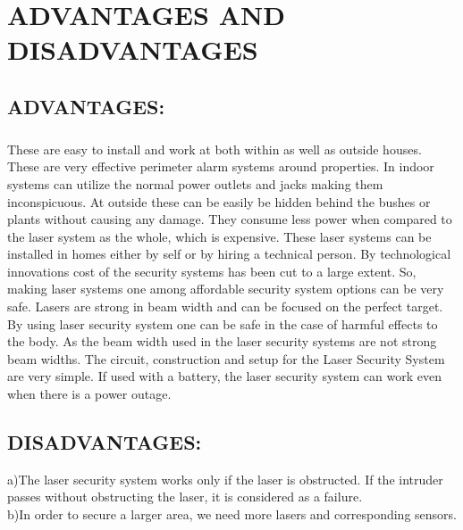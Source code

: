 
\chapter{ADVANTAGES AND DISADVANTAGES}
\section{ADVANTAGES:}
\paragraph{}
These are easy to install and work at both within as well as outside houses. These are very effective perimeter alarm systems around properties. In indoor systems can utilize the normal power outlets and jacks making them inconspicuous. At outside these can be easily be hidden behind the bushes or plants without causing any damage. They consume less power when compared to the laser system as the whole, which is expensive.
These laser systems can be installed in homes either by self or by hiring a technical person. By technological innovations cost of the security systems has been cut to a large extent. So, making laser systems one among affordable security system options can be very safe.
Lasers are strong in beam width and can be focused on the perfect target. By using laser security system one can be safe in the case of harmful effects to the body. As the beam width used in the laser security systems are not strong beam widths. 
The circuit, construction and setup for the Laser Security System are very simple. If used with a battery, the laser security system can work even when there is a power outage.
\paragraph{}
\section{DISADVANTAGES:}

a)The laser security system works only if the laser is obstructed. If the intruder passes without obstructing the laser, it is considered as a failure.
\\
b)In order to secure a larger area, we need more lasers and corresponding sensors.